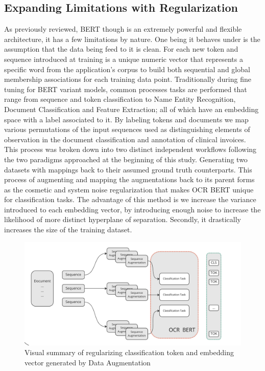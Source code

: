 \documentclass{article}
\begin{document}
    \subsection{Expanding Limitations with Regularization}
    As previously reviewed, BERT though is an extremely powerful and flexible architecture, it has a few limitations by nature. One being it behaves under is the assumption that the data being feed to it is clean. For each new token and sequence introduced at training is a unique numeric vector that represents a specific word from the application's corpus to build both sequential and global membership associations for each training data point. Traditionally during fine tuning for BERT variant models,  common processes tasks are performed that range from sequence and token classification to Name Entity Recognition, Document Classification and Feature Extraction; all of which  have an embedding space with a label associated to it. By labeling tokens and documents we map various permutations of the input sequences used as distinguishing elements of observation in the document classification and annotation of clinical invoices. This process was broken down into two distinct independent workflows following the two paradigms approached at the beginning of this study. Generating two datasets with mappings back to their assumed ground truth counterparts. This process of augmenting and mapping the augmentations back to its parent forms as the cosmetic and system noise regularization that makes OCR BERT unique for classification tasks. The advantage of this method is we increase the variance introduced to each embedding vector, by introducing enough noise to increase the likelihood of more distinct hyperplane of separation. Secondly, it drastically increases the size of the training dataset. \\
    
        \graphicspath{{Images/}}
    	\begin{figure}[htp]
    		\centering
    		\includegraphics[scale=.5]{regularization}
    		\caption{Visual summary of regularizing classification token and embedding vector generated by Data Augmentation}
    		\label{fig:reg}
    	\end{figure}
	
\end{document}
